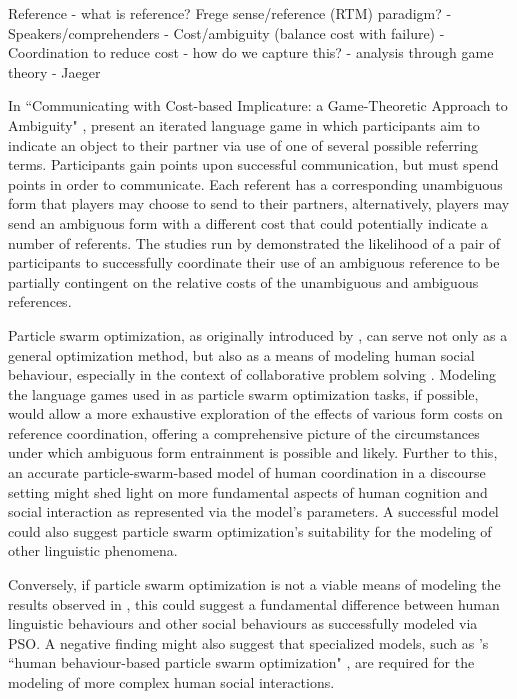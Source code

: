\documentclass[12pt]{article}
\begin{document}
Reference - what is reference? Frege sense/reference (RTM) paradigm? - Speakers/comprehenders - Cost/ambiguity (balance cost with failure) - Coordination to reduce cost - how do we capture this? - analysis through game theory - Jaeger

In ``Communicating with Cost-based Implicature: a Game-Theoretic Approach to Ambiguity" \citeyearpar{rohde2012}, \citeauthor{rohde2012} present an iterated language game in which participants aim to indicate an object to their partner via use of one of several possible referring terms. Participants gain points upon successful communication, but must spend points in order to communicate. Each referent has a corresponding unambiguous form that players may choose to send to
their partners, alternatively, players may send an ambiguous form with a different cost that could potentially indicate a number of referents. The studies run by \citeauthor{rohde2012} demonstrated the likelihood of a pair of participants to successfully coordinate their use of an ambiguous reference to be partially contingent on the relative costs of the unambiguous and ambiguous references.

Particle swarm optimization, as originally introduced by \citet*{kennedy1995}, can serve not only as a general optimization method, but also as a means of modeling human social behaviour, especially in the context of collaborative problem solving \citep{kennedy1997}. Modeling the language games used in \citeauthor{rohde2012} as particle swarm optimization tasks, if possible, would allow a more exhaustive exploration of the effects of various form costs on reference coordination, offering a comprehensive picture of the circumstances under which ambiguous form entrainment is possible and likely. Further to this, an accurate particle-swarm-based model of human coordination in a discourse setting might shed light on more fundamental aspects of human cognition and social interaction as represented via the model's parameters. A successful model could also suggest particle swarm optimization's suitability for the modeling of other linguistic phenomena. 

Conversely, if particle swarm optimization is not a viable means of modeling the results observed in \citeauthor{rohde2012}, this could suggest a fundamental difference between human linguistic behaviours and other social behaviours as successfully modeled via PSO. A negative finding might also suggest that specialized models, such as \citeauthor{liu2014}'s ``human behaviour-based particle swarm optimization" \citeyearpar{liu2014}, are required for the modeling of more complex human social interactions.
\end{document}
